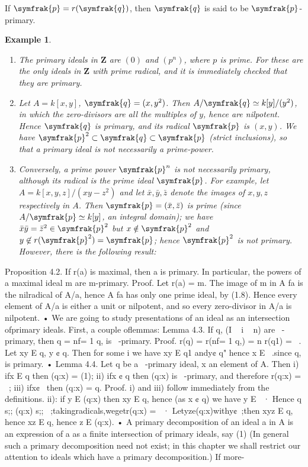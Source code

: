 \documentclass{standalone}
\newtheorem{example}{Example}
\theoremstyle{definition}
\theoremstyle{remark}
\begin{document}
If $\symfrak{p}=r(\symfrak{q})$, then $\symfrak{q}$ is said to be
$\symfrak{p}$-primary.
\begin{example}
\begin{enumerate}
\item The primary ideals in $\mathbf{Z}$ are $(0)$ and $(p^n)$, where $p$ is prime. For
  these are the only ideals in $\mathbf{Z}$ with prime radical, and it is immediately checked
  that they are primary.
\item Let $A=k[x,y]$, $\symfrak{q} = (x, y^2)$. Then $A/\symfrak{q} \simeq
  k[y]/(y^2)$,
  in which the zero-divisors are all the multiples of $y$, hence are nilpotent.
  Hence $\symfrak{q}$ is primary, and its radical $\symfrak{p}$ is $(x, y)$. We
  have $\symfrak{p}^2\subset \symfrak{q}\subset \symfrak{p}$ (strict inclusions),
  so that a primary ideal is not necessarily a prime-power.
\item Conversely, a prime power $\symfrak{p}^n$ is not necessarily primary, although its
  radical is the prime ideal $\symfrak{p}$. For example, let $A = k[x, y, z]/(xy
  - z^2)$
  and let $\bar{x},\bar{y}, \bar{z}$ denote the images of $x, y, z$ respectively
  in $A$. Then $\symfrak{p} = (\bar{x}, \bar{z})$ is prime
  (since $A/\symfrak{p}\simeq k[y]$, an integral domain);
  we have $\bar{x}\bar{y} = \bar{z}^2\in \symfrak{p}^2$ but $x \notin
  \symfrak{p}^2$ and $y \not\in r(\symfrak{p}^2 ) = \symfrak{p}$;
  hence $\symfrak{p}^2$ is not primary. However, there is the following result:
\end{enumerate}
\end{example}
Proposition 4.2. If r(a) is maximal, then a is primary. In particular, the
powers of a maximal ideal m are m-primary.
Proof. Let r(a) = m. The image of m in A fa is the nilradical of A/a, hence A fa
has only one prime ideal, by (1.8). Hence every element of A/a is either a unit or
nilpotent, and so every zero-divisor in A/a is nilpotent. •
We are going to study presentations of an ideal as an intersection ofprimary
ideals. First, a couple oflemmas:
Lemma 4.3. If q, (I ~ i ~ n) are ~-primary, then q = nf= 1 q, is ~-primary.
Proof. r(q) = r(nf= 1 q,) = n r(q1) = ~. Let xy E q, y ¢ q. Then for some i
we have xy E q1 andy¢ q" hence x E ~.since q, is primary. •
Lemma 4.4. Let q be a ~-primary ideal, x an element of A. Then
i) ifx E q then (q:x) = (1);
ii) ifx ¢ q then (q:x) is ~-primary, and therefore r(q:x) = ~;
iii) ifx¢~ then (q:x) = q.
Proof. i) and iii) follow immediately from the definitions.
ii): if y E (q:x) then xy E q, hence (as x ¢ q) we have y E ~· Hence q s;;
(q:x) s;; ~;takingradicals,wegetr(q:x) = ~· Letyze(q:x)withy¢~;then
xyz E q, hence xz E q, hence z E (q:x). •
A primary decomposition of an ideal a in A is an expression of a as a finite
intersection of primary ideals, say
(1)
(In general such a primary decomposition need not exist; in this chapter we shall
restrict our attention to ideals which have a primary decomposition.) If more-
\end{document}
